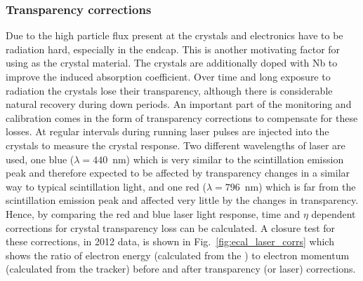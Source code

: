 \subsubsection{Transparency corrections}
Due to the high particle flux present at \CMS the \ECAL crystals and electronics have to be radiation hard, especially in the endcap. This is another motivating factor for using \PbWO as the crystal material. The crystals are additionally doped with Nb to improve the induced absorption coefficient. Over time and long exposure to radiation the crystals lose their transparency, although there is considerable natural recovery during down periods. An important part of the \ECAL monitoring and calibration comes in the form of transparency corrections to compensate for these losses. At regular intervals during \LHC running laser pulses are injected into the crystals to measure the crystal response. Two different wavelengths of laser are used, one blue ($\lambda=440$~nm) which is very similar to the scintillation emission peak and therefore expected to be affected by transparency changes in a similar way to typical scintillation light, and one red ($\lambda=796$~nm) which is far from the scintillation emission peak and affected very little by the changes in transparency. Hence, by comparing the red and blue laser light response, time and $\eta$ dependent corrections for crystal transparency loss can be calculated. A closure test for these corrections, in 2012 data, is shown in Fig.~\ref{fig:ecal_laser_corrs} which shows the ratio of electron energy (calculated from the \ECAL) to electron momentum (calculated from the tracker) before and after transparency (or laser) corrections. 
